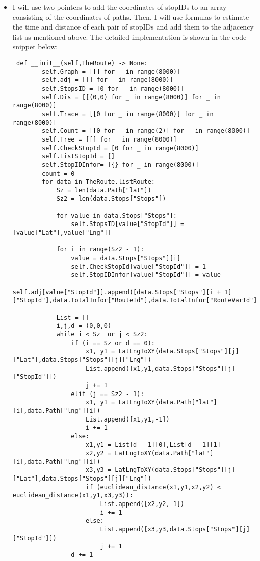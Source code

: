 \documentclass[12pt]{scrartcl}
\begin{document}
\begin{itemize}
\item I will use two pointers to add the coordinates of stopIDs to an array consisting of the coordinates of paths. Then, I will use formulas to estimate the time and distance of each pair of stopIDs and add them to the adjacency list as mentioned above. The detailed implementation is shown in the code snippet below:

\begin{lstlisting}
 def __init__(self,TheRoute) -> None:
        self.Graph = [[] for _ in range(8000)]
        self.adj = [[] for _ in range(8000)]
        self.StopsID = [0 for _ in range(8000)]
        self.Dis = [[(0,0) for _ in range(8000)] for _ in range(8000)]
        self.Trace = [[0 for _ in range(8000)] for _ in range(8000)]
        self.Count = [[0 for _ in range(2)] for _ in range(8000)]
        self.Tree = [[] for _ in range(8000)]
        self.CheckStopId = [0 for _ in range(8000)] 
        self.ListStopId = []
        self.StopIDInfor= [{} for _ in range(8000)]
        count = 0
        for data in TheRoute.listRoute:
            Sz = len(data.Path["lat"])
            Sz2 = len(data.Stops["Stops"])

            for value in data.Stops["Stops"]:
                self.StopsID[value["StopId"]] = [value["Lat"],value["Lng"]]
            
            for i in range(Sz2 - 1):
                value = data.Stops["Stops"][i]
                self.CheckStopId[value["StopId"]] = 1 
                self.StopIDInfor[value["StopId"]] = value
                self.adj[value["StopId"]].append([data.Stops["Stops"][i + 1]["StopId"],data.TotalInfor["RouteId"],data.TotalInfor["RouteVarId"]])

            List = []
            i,j,d = (0,0,0)
            while i < Sz  or j < Sz2:
                if (i == Sz or d == 0):
                    x1, y1 = LatLngToXY(data.Stops["Stops"][j]["Lat"],data.Stops["Stops"][j]["Lng"])
                    List.append([x1,y1,data.Stops["Stops"][j]["StopId"]])
                    j += 1
                elif (j == Sz2 - 1):
                    x1, y1 = LatLngToXY(data.Path["lat"][i],data.Path["lng"][i])
                    List.append([x1,y1,-1])
                    i += 1
                else:
                    x1,y1 = List[d - 1][0],List[d - 1][1]
                    x2,y2 = LatLngToXY(data.Path["lat"][i],data.Path["lng"][i])
                    x3,y3 = LatLngToXY(data.Stops["Stops"][j]["Lat"],data.Stops["Stops"][j]["Lng"])
                    if (euclidean_distance(x1,y1,x2,y2) < euclidean_distance(x1,y1,x3,y3)):
                        List.append([x2,y2,-1])
                        i += 1
                    else:
                        List.append([x3,y3,data.Stops["Stops"][j]["StopId"]])
                        j += 1
                d += 1
            

\end{lstlisting}
\end{itemize}
\end{document}
